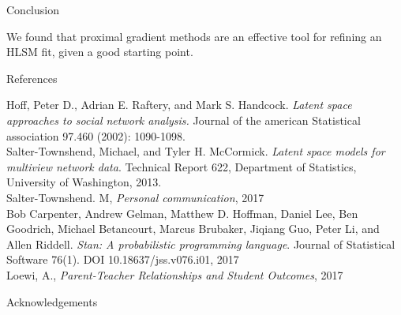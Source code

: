\documentclass[final]{beamer}
\newlength{\onecolwid}
\begin{document}
\begin{frame}[t]
\begin{columns}[t]
\begin{column}{\onecolwid}
\begin{block}{Conclusion}

We found that proximal gradient methods are an effective tool for
refining an HLSM fit, given a good starting point.


\end{block}



 \begin{block}{References}

 \nocite{*} %
 \small{
 \vspace{0.75in}}

Hoff, Peter D., Adrian E. Raftery, and Mark S. Handcock. \textit{Latent space approaches to social network analysis.} Journal of the american Statistical association 97.460 (2002): 1090-1098.\\
Salter-Townshend, Michael, and Tyler H. McCormick. \textit{Latent space models for multiview network data}. Technical Report 622, Department of Statistics, University of Washington, 2013.\\
Salter-Townshend. M, \textit{Personal communication}, 2017\\
Bob Carpenter, Andrew Gelman, Matthew D. Hoffman, Daniel Lee, Ben Goodrich, Michael Betancourt, Marcus Brubaker, Jiqiang Guo, Peter Li, and Allen Riddell. \textit{Stan: A probabilistic programming language}. Journal of Statistical Software 76(1). DOI 10.18637/jss.v076.i01, 2017\\
Loewi, A., \textit{Parent-Teacher Relationships and Student Outcomes}, 2017


 \end{block}



\begin{block}{Acknowledgements}


\end{block}
\end{column}
\end{columns}
\end{frame}
\end{document}
